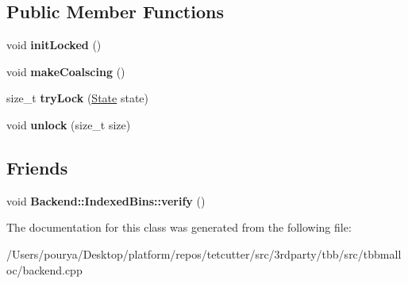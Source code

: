\subsection*{Public Member Functions}
\begin{DoxyCompactItemize}
\item 
\hypertarget{classrml_1_1internal_1_1GuardedSize_a6a7cb118023313c7ef8b138e34d7bbdf}{}void {\bfseries init\+Locked} ()\label{classrml_1_1internal_1_1GuardedSize_a6a7cb118023313c7ef8b138e34d7bbdf}

\item 
\hypertarget{classrml_1_1internal_1_1GuardedSize_a2b93f9e88583b7265aa1aff428fabe7a}{}void {\bfseries make\+Coalscing} ()\label{classrml_1_1internal_1_1GuardedSize_a2b93f9e88583b7265aa1aff428fabe7a}

\item 
\hypertarget{classrml_1_1internal_1_1GuardedSize_ad6a1c333f5909571f7473e6b5a5a7a1e}{}size\+\_\+t {\bfseries try\+Lock} (\hyperlink{structState}{State} state)\label{classrml_1_1internal_1_1GuardedSize_ad6a1c333f5909571f7473e6b5a5a7a1e}

\item 
\hypertarget{classrml_1_1internal_1_1GuardedSize_aff1231294f9be84d687871955a97526b}{}void {\bfseries unlock} (size\+\_\+t size)\label{classrml_1_1internal_1_1GuardedSize_aff1231294f9be84d687871955a97526b}

\end{DoxyCompactItemize}
\subsection*{Friends}
\begin{DoxyCompactItemize}
\item 
\hypertarget{classrml_1_1internal_1_1GuardedSize_a5ded4302f29ea027d939c14136d0ef70}{}void {\bfseries Backend\+::\+Indexed\+Bins\+::verify} ()\label{classrml_1_1internal_1_1GuardedSize_a5ded4302f29ea027d939c14136d0ef70}

\end{DoxyCompactItemize}


The documentation for this class was generated from the following file\+:\begin{DoxyCompactItemize}
\item 
/\+Users/pourya/\+Desktop/platform/repos/tetcutter/src/3rdparty/tbb/src/tbbmalloc/backend.\+cpp\end{DoxyCompactItemize}
